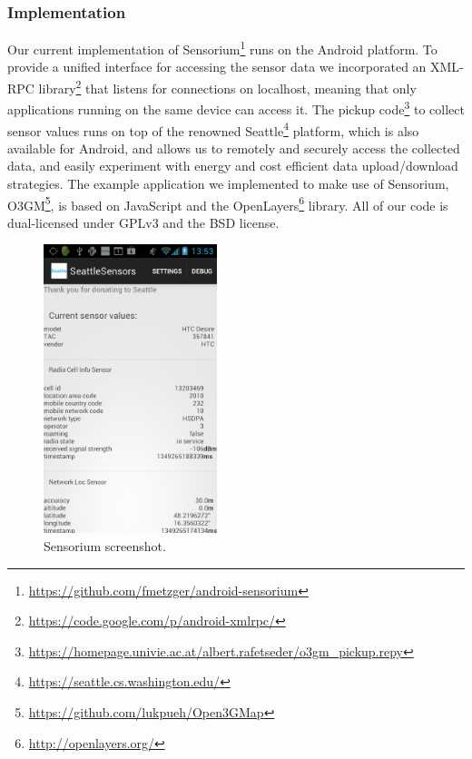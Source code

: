 \subsubsection{Implementation}

Our current implementation of Sensorium\footnote{\url{https://github.com/fmetzger/android-sensorium}} runs on the Android platform. To provide a unified interface for accessing the sensor data we incorporated an \acrshort{XML}-\acrshort{RPC} library\footnote{\url{https://code.google.com/p/android-xmlrpc/}} that listens for connections on localhost, meaning that only applications running on the same device can access it. The pickup code\footnote{\url{https://homepage.univie.ac.at/albert.rafetseder/o3gm_pickup.repy}} to collect sensor values runs on top of the renowned Seattle\footnote{\url{https://seattle.cs.washington.edu/}} platform, which is also available for Android, and allows us to remotely and securely access the collected data, and easily experiment with energy and cost efficient data upload/download strategies. The example application we implemented to make use of Sensorium, O3GM\footnote{\url{https://github.com/lukpueh/Open3GMap}}, is based on JavaScript and the OpenLayers\footnote{\url{http://openlayers.org/}} library. All of our code is dual-licensed under \gls{GPLv3} and the \acrshort{BSD} license.

\begin{figure}[htb]
\centering
\includegraphics[width=0.45\textwidth]{images/sesescreenshot.png}
\caption{Sensorium screenshot.}
\label{c5:fig:screenshot}
\end{figure}

